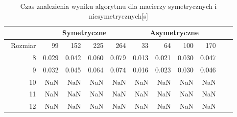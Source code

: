 \begin{table}
\centering
\begin{tabular}{|r|r|r|r|r|r|r|r|r|r|r|}
\hline
 & \multicolumn{4}{|c|}{Symetryczne} & \multicolumn{4}{|c|}{Asymetryczne} \\ \hline\
Rozmiar & 99 & 152 & 225 & 264 & 33 & 64 & 100 & 170 \\ \hline
8 & 0.029 & 0.042 & 0.060 & 0.079 & 0.013 & 0.021 & 0.030 & 0.047 \\
9 & 0.032 & 0.045 & 0.064 & 0.074 & 0.016 & 0.023 & 0.030 & 0.046 \\
10 & NaN & NaN & NaN & NaN & NaN & NaN & NaN & NaN \\
11 & NaN & NaN & NaN & NaN & NaN & NaN & NaN & NaN \\
12 & NaN & NaN & NaN & NaN & NaN & NaN & NaN & NaN \\ \hline
\end{tabular}
\caption{Czas znalezienia wyniku algorytmu dla macierzy symetrycznych i niesymetrycznych[s]}
\label{tab:time_AnNeigMet}
\end{table}
